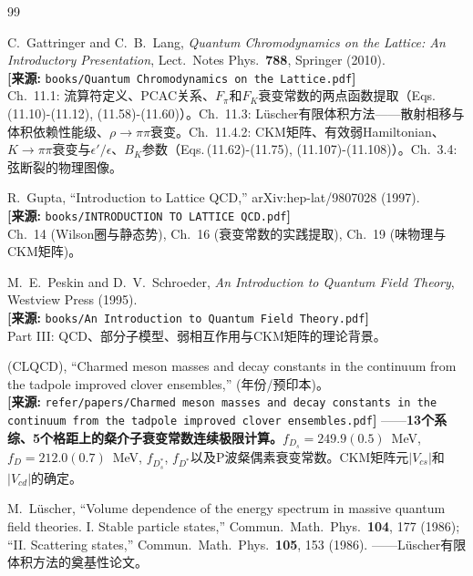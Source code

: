 \documentclass[12pt,a4paper]{ctexart}
\theoremstyle{definition}
\begin{document}
\begin{thebibliography}{99}

C.~Gattringer and C.~B.~Lang,
\textit{Quantum Chromodynamics on the Lattice: An Introductory Presentation},
Lect.\ Notes Phys.\ \textbf{788}, Springer (2010).
\\\textbf{[来源:} \texttt{books/Quantum Chromodynamics on the Lattice.pdf}\textbf{]}
\\Ch.~11.1: 流算符定义、PCAC关系、$F_\pi$和$F_K$衰变常数的两点函数提取（Eqs.\,(11.10)-(11.12), (11.58)-(11.60)）。Ch.~11.3: L\"uscher有限体积方法——散射相移与体积依赖性能级、$\rho\to\pi\pi$衰变。Ch.~11.4.2: CKM矩阵、有效弱Hamiltonian、$K\to\pi\pi$衰变与$\epsilon'/\epsilon$、$B_K$参数（Eqs.\,(11.62)-(11.75), (11.107)-(11.108)）。Ch.~3.4: 弦断裂的物理图像。

R.~Gupta,
``Introduction to Lattice QCD,''
arXiv:hep-lat/9807028 (1997).
\\\textbf{[来源:} \texttt{books/INTRODUCTION TO LATTICE QCD.pdf}\textbf{]}
\\Ch.~14 (Wilson圈与静态势), Ch.~16 (衰变常数的实践提取), Ch.~19 (味物理与CKM矩阵)。

M.~E.~Peskin and D.~V.~Schroeder,
\textit{An Introduction to Quantum Field Theory},
Westview Press (1995).
\\\textbf{[来源:} \texttt{books/An Introduction to Quantum Field Theory.pdf}\textbf{]}
\\Part III: QCD、部分子模型、弱相互作用与CKM矩阵的理论背景。

(CLQCD),
``Charmed meson masses and decay constants in the continuum from the tadpole improved clover ensembles,''
(年份/预印本)。
\\\textbf{[来源:} \texttt{refer/papers/Charmed meson masses and decay constants in the continuum from the tadpole improved clover ensembles.pdf}\textbf{]}
——\textbf{13个系综、5个格距上的粲介子衰变常数连续极限计算。}$f_{D_s}=249.9(0.5)$~MeV, $f_D=212.0(0.7)$~MeV, $f_{D_s^*}$, $f_{D^*}$以及P波粲偶素衰变常数。CKM矩阵元$|V_{cs}|$和$|V_{cd}|$的确定。

M.~L\"uscher,
``Volume dependence of the energy spectrum in massive quantum field theories. I. Stable particle states,''
Commun.\ Math.\ Phys.\ \textbf{104}, 177 (1986);
``II. Scattering states,'' Commun.\ Math.\ Phys.\ \textbf{105}, 153 (1986).
——L\"uscher有限体积方法的奠基性论文。


\end{thebibliography}
\end{document}
